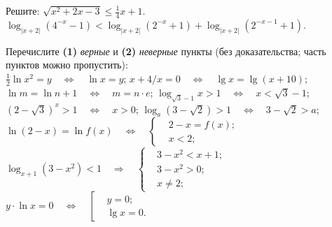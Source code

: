 %
%



\begin{problems}

\item
Решите:
\qquad
\sbp $\sqrt{x^2 + 2 x - 3} \leq \frac{1}{4} x + 1$.
\\[0.5ex]
\sbp
\(
    \log_{|x + 2|} (4^{-x} - 1)
    <
    \log_{|x + 2|} (2^{-x} + 1)
    +
    \log_{|x + 2|} (2^{-x - 1} + 1)
\).

\item
Перечислите \textbf{(1)} \emph{верные} и \textbf{(2)} \emph{неверные} пункты
(без доказательства; часть пунктов можно пропустить):
\\%
\sbp $\frac{1}{2} \ln x^2 = y \quad\Leftrightarrow\quad \ln x = y$;
\qquad%
\sbp $x + 4/x = 0 \quad\Leftrightarrow\quad \lg x = \lg (x + 10)$;
\\[0.5ex]%
\sbp $\ln m = \ln n + 1 \quad\Leftrightarrow\quad m = n \cdot e$;
\qquad%
\sbp $\log_{\sqrt{3} - 1} x > 1 \quad\Leftrightarrow\quad x < \sqrt{3} - 1$;
\\[0.5ex]%
\sbp $(2 - \sqrt{3})^x > 1 \quad\Leftrightarrow\quad x > 0$;
\qquad%
\sbp $\log_a (3 - \sqrt{2}) > 1 \quad\Leftrightarrow\quad 3 - \sqrt{2} > a$;
\\%
\sbp
\(
    \ln (2 - x) = \ln f(x)
\quad\Leftrightarrow\quad
    \left\{\begin{aligned}
        & 2 - x = f(x) ; \\
        & x < 2 ;
    \end{aligned}\right.
\)
\\[1ex]%
\sbp
\(
    \log_{x + 1} (3 - x^2) < 1
\quad\Rightarrow\quad
    \left\{\begin{aligned}
        & 3 - x^2 < x + 1 ; \\
        & 3 - x^2 > 0 ; \\
        & x \neq 2 ;
    \end{aligned}\right.
\)
\\[1ex]%
\sbp
\(
    y \cdot \ln x = 0
\quad\Leftrightarrow\quad
    \left[\begin{aligned}
        & y = 0 ; \\
        & \lg x = 0 .
    \end{aligned}\right.
\)

\end{problems}


